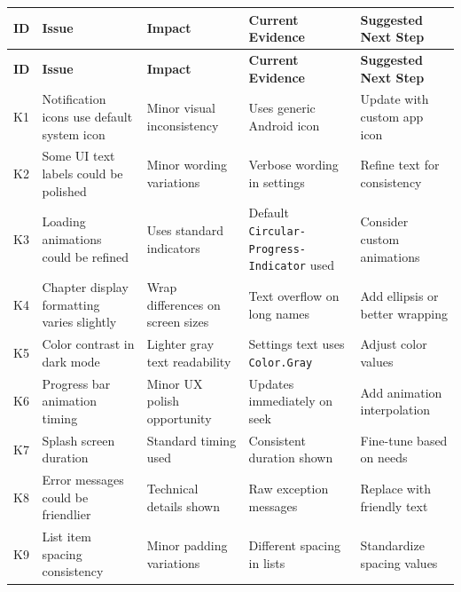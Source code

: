 \documentclass[11pt,a4paper]{article}
\begin{document}
{\footnotesize
\begin{longtable}{|p{0.6cm}|>{\RaggedRight}p{4cm}|>{\RaggedRight}p{2.2cm}|>{\RaggedRight}p{2.8cm}|>{\RaggedRight}p{3cm}|}
\hline
\textbf{ID} & \textbf{Issue} & \textbf{Impact} & \textbf{Current Evidence} & \textbf{Suggested Next Step} \\ \hline
\endfirsthead
\hline
\textbf{ID} & \textbf{Issue} & \textbf{Impact} & \textbf{Current Evidence} & \textbf{Suggested Next Step} \\ \hline
\endhead
K1 & Notification icons use default system icon & Minor visual inconsistency & Uses generic Android icon & Update with custom app icon \\ \hline
K2 & Some UI text labels could be polished & Minor wording variations & Verbose wording in settings & Refine text for consistency \\ \hline
K3 & Loading animations could be refined & Uses standard indicators & Default \texttt{Circular-} \texttt{Progress-} \texttt{Indicator} used & Consider custom animations \\ \hline
K4 & Chapter display formatting varies slightly & Wrap differences on screen sizes & Text overflow on long names & Add ellipsis or better wrapping \\ \hline
K5 & Color contrast in dark mode & Lighter gray text readability & Settings text uses \texttt{Color.Gray} & Adjust color values \\ \hline
K6 & Progress bar animation timing & Minor UX polish opportunity & Updates immediately on seek & Add animation interpolation \\ \hline
K7 & Splash screen duration & Standard timing used & Consistent duration shown & Fine-tune based on needs \\ \hline
K8 & Error messages could be friendlier & Technical details shown & Raw exception messages & Replace with friendly text \\ \hline
K9 & List item spacing consistency & Minor padding variations & Different spacing in lists & Standardize spacing values \\ \hline
\end{longtable}
}
\end{document}
